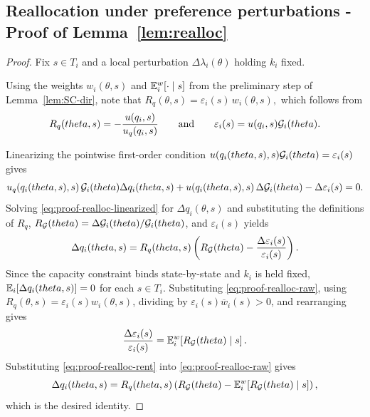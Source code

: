 \documentclass{class}
\begin{document}
\subsection{Reallocation under preference perturbations - Proof of Lemma~\ref{lem:realloc}}\label{proof:realloc}


\begin{proof}
Fix $s\in T_i$ and a local perturbation $\Delta\lambda_i(\theta)$ holding $k_i$ fixed.

Using the weights $w_i(\theta,s)$ and $\mathbb{E}_i^w[\cdot\mid s]$ from the preliminary step of Lemma~\ref{lem:SC-dir}, note that
$R_q(\theta,s)=\varepsilon_i(s)\,w_i(\theta,s),$
which follows from
\[
R_q(theta,s)=
-\frac{u(q_i,s)}{u_q(q_i,s)}
\qquad\text{and}\qquad
\varepsilon_i(s)=u(q_i,s)\mathcal{G}_i(theta).
\]

Linearizing the pointwise first-order condition
$u(q_i(theta,s),s)\mathcal{G}_i(theta)=\varepsilon_i(s)$
gives
\begin{equation}\label{eq:proof-realloc-linearized}
u_q\!\left(q_i(theta,s),s\right)\mathcal{G}_i(theta)\Delta q_i(theta,s)
+
u\!\left(q_i(theta,s),s\right)\Delta\mathcal{G}_i(theta)
-
\Delta\varepsilon_i(s)
=
0.
\end{equation}
Solving \ref{eq:proof-realloc-linearized} for $\Delta q_i(\theta,s)$ and substituting the definitions of $R_q$, $R_{\mathcal{G}}(theta)=\Delta\mathcal{G}_i(theta)/\mathcal{G}_i(theta)$, and $\varepsilon_i(s)$ yields
\begin{equation}\label{eq:proof-realloc-raw}
\Delta q_i(theta,s)
=
R_q(theta,s)
\left(
R_{\mathcal{G}}(theta)
-
\frac{\Delta\varepsilon_i(s)}{\varepsilon_i(s)}
\right).
\end{equation}
Since the capacity constraint binds state-by-state and $k_i$ is held fixed, $\mathbb{E}_i\!\left[\Delta q_i(theta,s)\right]=0$ for each $s\in T_i$. Substituting \ref{eq:proof-realloc-raw}, using $R_q(\theta,s)=\varepsilon_i(s)w_i(\theta,s)$, dividing by $\varepsilon_i(s)\overline w_i(s)>0$, and rearranging gives
\begin{equation}\label{eq:proof-realloc-rent}
\frac{\Delta\varepsilon_i(s)}{\varepsilon_i(s)} = \mathbb{E}_i^w\!\left[R_{\mathcal{G}}(theta)\mid s\right].
\end{equation}
Substituting \ref{eq:proof-realloc-rent} into \ref{eq:proof-realloc-raw} gives
\begin{equation}\label{eq:proof-realloc}
\Delta q_i(theta,s)
=
R_q(theta,s)
\left(
R_{\mathcal{G}}(theta)-\mathbb{E}_i^w\!\left[R_{\mathcal{G}}(theta)\mid s\right]
\right),
\end{equation}
which is the desired identity.
\end{proof}
\end{document}
